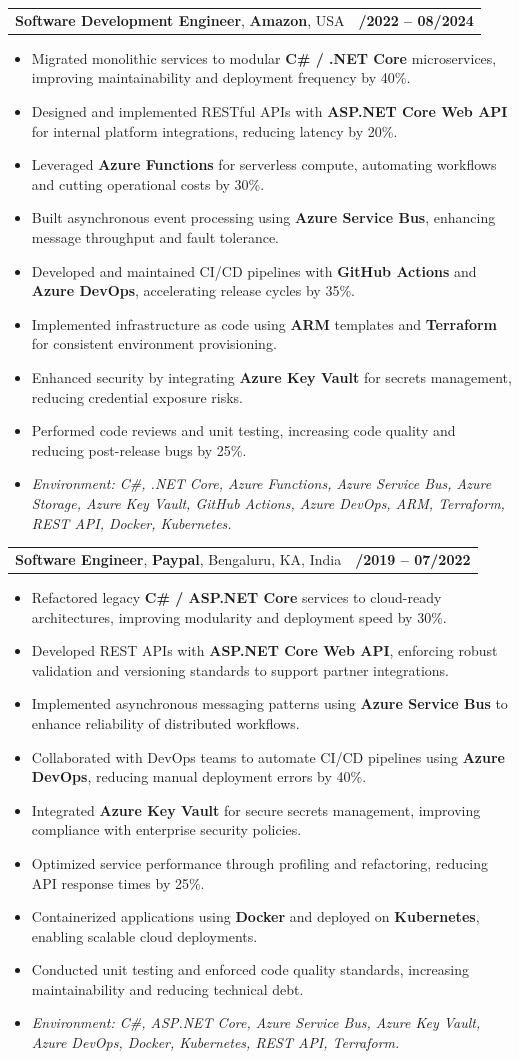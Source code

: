 \documentclass[letterpaper,11pt]{article}
\makeatletter
\newcommand{\resumeItem}[1]{
  \item\footnotesize{
    {#1 \vspace{-2pt}}
  }
}
\newcommand{\resumeSubheading}[4]{
  \vspace{-2pt}\item
    \begin{tabular*}{1.0\textwidth}[t]{l@{\extracolsep{\fill}}r}
      \textbf{\fontsize{10pt}{14pt}\selectfont #3}, \textbf{\fontsize{10pt}{14pt}\selectfont #1}, \fontsize{10pt}{14pt}\selectfont #4 & \textbf{\fontsize{10pt}{14pt}\selectfont #2} \\
    \end{tabular*}\vspace{-7pt}
}
\newcommand{\resumeItemListStart}{\begin{itemize}[leftmargin=*]}
\newcommand{\resumeItemListEnd}{\end{itemize}\vspace{-5pt}}
\makeatother
\begin{document}
\resumeSubheading
{Amazon}{10/2022 -- 08/2024}
{Software Development Engineer}{USA}
\resumeItemListStart
  \resumeItem{Migrated monolithic services to modular \textbf{C\# / .NET Core} microservices, improving maintainability and deployment frequency by 40\%.}
  \resumeItem{Designed and implemented RESTful APIs with \textbf{ASP.NET Core Web API} for internal platform integrations, reducing latency by 20\%.}
  \resumeItem{Leveraged \textbf{Azure Functions} for serverless compute, automating workflows and cutting operational costs by 30\%.}
  \resumeItem{Built asynchronous event processing using \textbf{Azure Service Bus}, enhancing message throughput and fault tolerance.}
  \resumeItem{Developed and maintained CI/CD pipelines with \textbf{GitHub Actions} and \textbf{Azure DevOps}, accelerating release cycles by 35\%.}
  \resumeItem{Implemented infrastructure as code using \textbf{ARM} templates and \textbf{Terraform} for consistent environment provisioning.}
  \resumeItem{Enhanced security by integrating \textbf{Azure Key Vault} for secrets management, reducing credential exposure risks.}
  \resumeItem{Performed code reviews and unit testing, increasing code quality and reducing post-release bugs by 25\%.}
  \resumeItem{\textit{Environment: C\#, .NET Core, Azure Functions, Azure Service Bus, Azure Storage, Azure Key Vault, GitHub Actions, Azure DevOps, ARM, Terraform, REST API, Docker, Kubernetes.}}
\resumeItemListEnd

\resumeSubheading
{Paypal}{08/2019 -- 07/2022}
{Software Engineer}{Bengaluru, KA, India}
\resumeItemListStart
  \resumeItem{Refactored legacy \textbf{C\# / ASP.NET Core} services to cloud-ready architectures, improving modularity and deployment speed by 30\%.}
  \resumeItem{Developed REST APIs with \textbf{ASP.NET Core Web API}, enforcing robust validation and versioning standards to support partner integrations.}
  \resumeItem{Implemented asynchronous messaging patterns using \textbf{Azure Service Bus} to enhance reliability of distributed workflows.}
  \resumeItem{Collaborated with DevOps teams to automate CI/CD pipelines using \textbf{Azure DevOps}, reducing manual deployment errors by 40\%.}
  \resumeItem{Integrated \textbf{Azure Key Vault} for secure secrets management, improving compliance with enterprise security policies.}
  \resumeItem{Optimized service performance through profiling and refactoring, reducing API response times by 25\%.}
  \resumeItem{Containerized applications using \textbf{Docker} and deployed on \textbf{Kubernetes}, enabling scalable cloud deployments.}
  \resumeItem{Conducted unit testing and enforced code quality standards, increasing maintainability and reducing technical debt.}
  \resumeItem{\textit{Environment: C\#, ASP.NET Core, Azure Service Bus, Azure Key Vault, Azure DevOps, Docker, Kubernetes, REST API, Terraform.}}
\resumeItemListEnd
\end{document}
